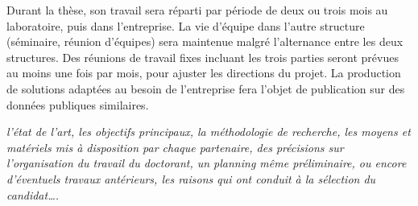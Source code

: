\documentclass[a4paper,11pt]{article}
\begin{document}
Durant la thèse, son travail sera réparti par période de deux ou trois mois au laboratoire, puis dans l'entreprise. La vie d'équipe dans l'autre structure (séminaire, réunion d'équipes) sera maintenue malgré l'alternance entre les deux structures. Des réunions de travail fixes incluant les trois parties seront prévues au moins une fois par mois, pour ajuster les directions du projet. %
La production de solutions adaptées au besoin de l'entreprise fera l'objet de publication sur des données publiques similaires. 




\textit{l’état de l’art, les objectifs principaux, la méthodologie de recherche, les moyens et matériels mis à disposition par chaque partenaire, des précisions sur l’organisation du travail du doctorant, un planning même préliminaire, ou encore d’éventuels travaux antérieurs, les raisons qui ont conduit à la sélection du candidat…. }



\end{document}
